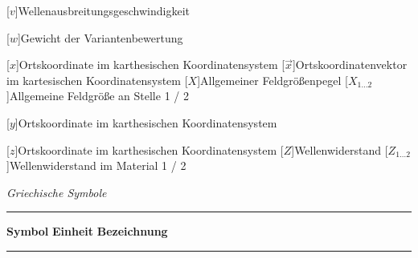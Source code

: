 \begin{acronym}[Platzhalterwort]
[$v$]{\acrounit{\meter\per\second}Wellenausbreitungsgeschwindigkeit}

[$w$]{\acrounit{-}Gewicht der Variantenbewertung}

[$x$]{\acrounit{-}Ortskoordinate im karthesischen Koordinatensystem}
[$\vec x$]{\acrounit{-}Ortskoordinatenvektor im kartesischen Koordinatensystem}
[$X$]{\acrounit{\Dezibel}Allgemeiner Feldgrößenpegel}
[$X_{1\ldots2}$]{\acrounit{-}Allgemeine Feldgröße an Stelle 1 / 2}

[$y$]{\acrounit{-}Ortskoordinate im karthesischen Koordinatensystem}

[$z$]{\acrounit{-}Ortskoordinate im karthesischen Koordinatensystem}
[$Z$]{\acrounit{-}Wellenwiderstand}
[$Z_{1\ldots2}$]{\acrounit{-}Wellenwiderstand im Material 1 / 2}

\end{acronym}
\newpage



\textit{Griechische Symbole} \\[.5\linespace]
\noindent\rule{\textwidth}{0.5pt}
\textbf{Symbol} \hspace{12.5mm} \textbf{Einheit} \hspace{10.5mm} \textbf{Bezeichnung} \\[-\linespace]
\noindent\rule{\textwidth}{0.5pt}

